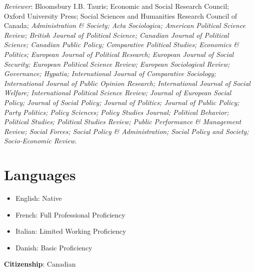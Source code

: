 \documentclass[letterpaper,fontsize=10.5pt]{scrartcl}
\begin{document}
\hfill \break
{}
{}\textit{Reviewer}: Bloomsbury I.B. Tauris; Economic and Social Research Council; Oxford University Press; Social Sciences and Humanities Research Council of Canada; \textit{Administration \& Society; Acta Sociologica; American Political Science Review; British Journal of Political Science; Canadian Journal of Political Science; Canadian Public Policy; Comparative Political Studies; Economics \& Politics; European Journal of Political Research; European Journal of Social Security; European Political Science Review; European Sociological Review; Governance; Hypatia; International Journal of Comparative Sociology; International Journal of Public Opinion Research; International Journal of Social Welfare; International Political Science Review; Journal of European Social Policy; Journal of Social Policy; Journal of Politics; Journal of Public Policy; Party Politics; Policy Sciences; Policy Studies Journal; Political Behavior; Political Studies; Political Studies Review; Public Performance \& Management Review; Social Forces; Social Policy \& Administration; Social Policy and Society; Socio-Economic Review}.

\section{Languages}
\begin{itemize}[itemsep=0em, topsep=0em, partopsep=0em]
	\item English: Native
	\item French: Full Professional Proficiency
	\item Italian: Limited Working Proficiency
	\item Danish: Basic Proficiency\\
\end{itemize}

{}\textbf{Citizenship}: Canadian

\end{document}
